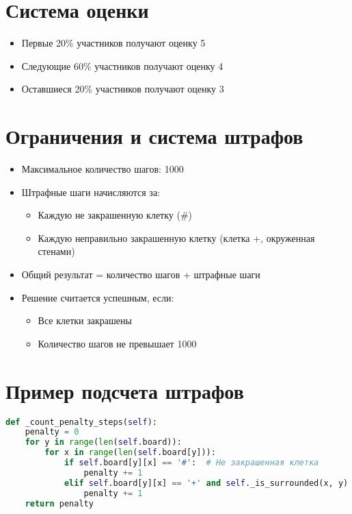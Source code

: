 \documentclass{article}
\begin{document}
\section{Система оценки}
\begin{itemize}
    \item Первые 20\% участников получают оценку 5
    \item Следующие 60\% участников получают оценку 4
    \item Оставшиеся 20\% участников получают оценку 3
\end{itemize}

\section{Ограничения и система штрафов}
\begin{itemize}
    \item Максимальное количество шагов: 1000
    \item Штрафные шаги начисляются за:
    \begin{itemize}
        \item Каждую не закрашенную клетку (\#)
        \item Каждую неправильно закрашенную клетку (клетка +, окруженная стенами)
    \end{itemize}
    \item Общий результат = количество шагов + штрафные шаги
    \item Решение считается успешным, если:
    \begin{itemize}
        \item Все клетки закрашены
        \item Количество шагов не превышает 1000
    \end{itemize}
\end{itemize}

\section{Пример подсчета штрафов}
\begin{lstlisting}[language=Python]
def _count_penalty_steps(self):
    penalty = 0
    for y in range(len(self.board)):
        for x in range(len(self.board[y])):
            if self.board[y][x] == '#':  # Не закрашенная клетка
                penalty += 1
            elif self.board[y][x] == '+' and self._is_surrounded(x, y):
                penalty += 1
    return penalty
\end{lstlisting}
\end{document}
